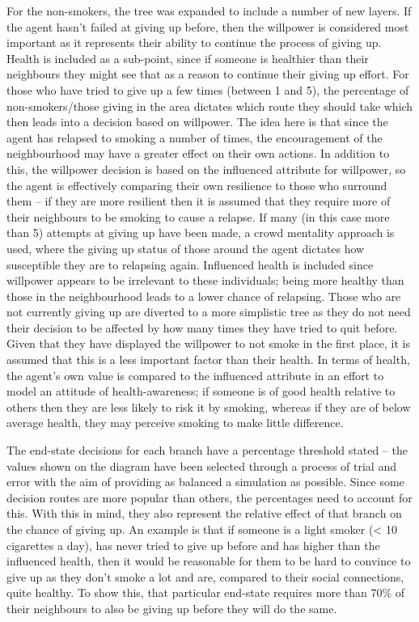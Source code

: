 \documentclass[]{report}
\begin{document}
For the non-smokers, the tree was expanded to include a number of new layers. If the agent hasn't failed at giving up before, then the willpower is considered most important as it represents their ability to continue the process of giving up. Health is included as a sub-point, since if someone is healthier than their neighbours they might see that as a reason to continue their giving up effort. For those who have tried to give up a few times (between 1 and 5), the percentage of non-smokers/those giving in the area dictates which route they should take which then leads into a decision based on willpower. The idea here is that since the agent has relapsed to smoking a number of times, the encouragement of the neighbourhood may have a greater effect on their own actions. In addition to this, the willpower decision is based on the influenced attribute for willpower, so the agent is effectively comparing their own resilience to those who surround them – if they are more resilient then it is assumed that they require more of their neighbours to be smoking to cause a relapse. If many (in this case more than 5) attempts at giving up have been made, a crowd mentality approach is used, where the giving up status of those around the agent dictates how susceptible they are to relapsing again. Influenced health is included since willpower appears to be irrelevant to these individuals; being more healthy than those in the neighbourhood leads to a lower chance of relapsing. Those who are not currently giving up are diverted to a more simplistic tree as they do not need their decision to be affected by how many times they have tried to quit before. Given that they have displayed the willpower to not smoke in the first place, it is assumed that this is a less important factor than their health. In terms of health, the agent's own value is compared to the influenced attribute in an effort to model an attitude of health-awareness; if someone is of good health relative to others then they are less likely to risk it by smoking, whereas if they are of below average health, they may perceive smoking to make little difference.

The end-state decisions for each branch have a percentage threshold stated – the values shown on the diagram have been selected through a process of trial and error with the aim of providing as balanced a simulation as possible. Since some decision routes are more popular than others, the percentages need to account for this. With this in mind, they also represent the relative effect of that branch on the chance of giving up. An example is that if someone is a light smoker (< 10 cigarettes a day), has never tried to give up before and has higher than the influenced health, then it would be reasonable for them to be hard to convince to give up as they don't smoke a lot and are, compared to their social connections, quite healthy. To show this, that particular end-state requires more than 70\% of their neighbours to also be giving up before they will do the same.
\end{document}
